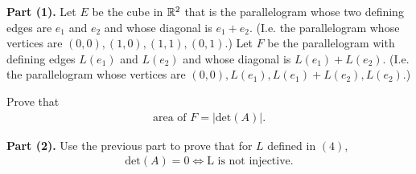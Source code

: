 \textbf{Part (1).} Let $E$ be the cube in $\mathbb R^2$ that is the parallelogram whose two defining edges are $e_1$ and $e_2$ and whose diagonal is $e_1+e_2$. (I.e. the parallelogram whose vertices are $(0,0),(1,0),(1,1),(0,1)$.) Let $F$ be the parallelogram with defining edges $L(e_1)$ and $L(e_2)$ and whose diagonal is $L(e_1)+L(e_2)$. (I.e. the parallelogram whose vertices are $(0,0),L(e_1),L(e_1)+L(e_2),L(e_2).$)

Prove that 
\[
    \begin{aligned}
        \text{area of }F=|\text{det}(A)|.
    \end{aligned}
\]

\textbf{Part (2).} Use the previous part to prove that for $L$ defined in $(4)$, 
\[
    \begin{aligned}
        \text{det}(A)=0\iff\text{L is not injective.}
    \end{aligned}
\]

